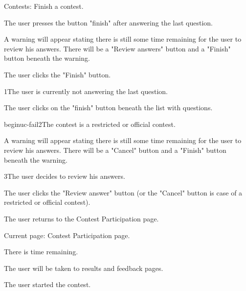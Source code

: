 \begin{uc}{Contests: Finish a contest.}

    \begin{uc-mss}
    \item The user presses the button "finish" after answering the last question.
    \item A warning will appear stating there is still some time remaining for the user to review his answers. There will be a "Review answers" button and a "Finish" button beneath the warning.
    \item The user clicks the "Finish" button.
    \end{uc-mss}

    \begin{uc-ext}

        \begin{uc-fail}{1}{The user is currently not answering the last question.}
        \item The user clicks on the "finish" button beneath the list with questions. 
        \end{uc-fail}

	begin{uc-fail}{2}{The contest is a restricted or official contest.}
	\item A warning will appear stating there is still some time remaining for the user to review his answers. There will be a "Cancel" button and a "Finish" button beneath the warning. 

	\begin{uc-fail}{3}{The user decides to review his answers.}
	\item The user clicks the "Review answer" button (or the "Cancel" button is case of a restricted or official contest).
	\item The user returns to the Contest Participation page. 
	\end{uc-fail}

    \end{uc-ext}

    \begin{uc-pre}
    \item Current page: Contest Participation page.
    \item There is time remaining. 
    \end{uc-pre}

    \begin{uc-post}
    \item The user will be taken to results and feedback pages. 
    \end{uc-post}

    \begin{uc-trig}
    The user started the contest. 
    \end{uc-trig}

\end{uc}